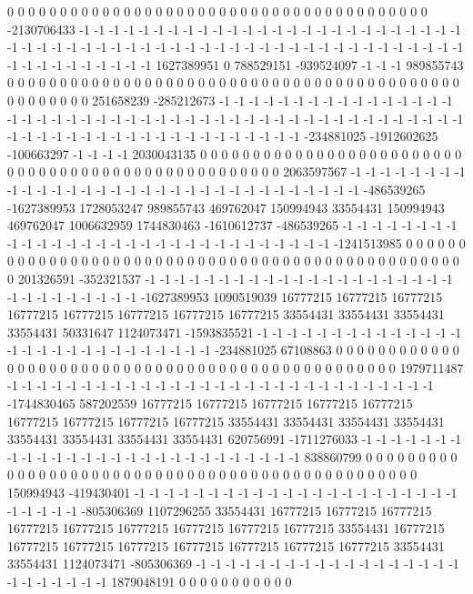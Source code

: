 0 0 0 0 0 0 0 0 0 0 0 0 0 0 0 0 0 0 0 0 0 0 0 0 0 0 0 0 0 0 0 0 0 0 0 0 0 0 0 0 -2130706433 -1 -1 -1 -1 -1 -1 -1 -1 -1 -1 -1 -1 -1 -1 -1 -1 -1 -1 -1 -1 -1 -1 -1 -1 -1 -1 -1 -1 -1 -1 -1 -1 -1 -1 -1 -1 -1 -1 -1 -1 -1 -1 -1 -1 -1 -1 -1 -1 -1 -1 -1 -1 -1 -1 -1 -1 -1 -1 -1 -1 -1 -1 -1 -1 -1 -1 -1 1627389951 0 788529151 -939524097 -1 -1 -1 989855743 0 0 0 0 0 0 0 0 0 0 0 0
0 0 0 0 0 0 0 0 0 0 0 0 0 0 0 0 0 0 0 0 0 0 0 0 0 0 0 0 0 0 0 0 0 0 0 0 0 0 0 251658239 -285212673 -1 -1 -1 -1 -1 -1 -1 -1 -1 -1 -1 -1 -1 -1 -1 -1 -1 -1 -1 -1 -1 -1 -1 -1 -1 -1 -1 -1 -1 -1 -1 -1 -1 -1 -1 -1 -1 -1 -1 -1 -1 -1 -1 -1 -1 -1 -1 -1 -1 -1 -1 -1 -1 -1 -1 -1 -1 -1 -1 -1 -1 -1 -1 -1 -1 -1 -1 -234881025 -1912602625 -100663297 -1 -1 -1 -1 2030043135 0 0 0 0 0 0 0 0 0 0 0 0
0 0 0 0 0 0 0 0 0 0 0 0 0 0 0 0 0 0 0 0 0 0 0 0 0 0 0 0 0 0 0 0 0 0 0 0 0 0 0 2063597567 -1 -1 -1 -1 -1 -1 -1 -1 -1 -1 -1 -1 -1 -1 -1 -1 -1 -1 -1 -1 -1 -1 -1 -1 -1 -1 -1 -1 -1 -1 -1 -1 -486539265 -1627389953 1728053247 989855743 469762047 150994943 33554431 150994943 469762047 1006632959 1744830463 -1610612737 -486539265 -1 -1 -1 -1 -1 -1 -1 -1 -1 -1 -1 -1 -1 -1 -1 -1 -1 -1 -1 -1 -1 -1 -1 -1 -1 -1 -1 -1 -1 -1 -1241513985 0 0 0 0 0 0 0 0 0 0 0 0
0 0 0 0 0 0 0 0 0 0 0 0 0 0 0 0 0 0 0 0 0 0 0 0 0 0 0 0 0 0 0 0 0 0 0 0 0 0 201326591 -352321537 -1 -1 -1 -1 -1 -1 -1 -1 -1 -1 -1 -1 -1 -1 -1 -1 -1 -1 -1 -1 -1 -1 -1 -1 -1 -1 -1 -1 -1 -1 -1627389953 1090519039 16777215 16777215 16777215 16777215 16777215 16777215 16777215 16777215 33554431 33554431 33554431 33554431 50331647 1124073471 -1593835521 -1 -1 -1 -1 -1 -1 -1 -1 -1 -1 -1 -1 -1 -1 -1 -1 -1 -1 -1 -1 -1 -1 -1 -1 -1 -1 -1 -1 -234881025 67108863 0 0 0 0 0 0 0 0 0 0 0
0 0 0 0 0 0 0 0 0 0 0 0 0 0 0 0 0 0 0 0 0 0 0 0 0 0 0 0 0 0 0 0 0 0 0 0 0 0 1979711487 -1 -1 -1 -1 -1 -1 -1 -1 -1 -1 -1 -1 -1 -1 -1 -1 -1 -1 -1 -1 -1 -1 -1 -1 -1 -1 -1 -1 -1 -1744830465 587202559 16777215 16777215 16777215 16777215 16777215 16777215 16777215 16777215 16777215 33554431 33554431 33554431 33554431 33554431 33554431 33554431 33554431 620756991 -1711276033 -1 -1 -1 -1 -1 -1 -1 -1 -1 -1 -1 -1 -1 -1 -1 -1 -1 -1 -1 -1 -1 -1 -1 -1 -1 -1 -1 838860799 0 0 0 0 0 0 0 0 0 0 0
0 0 0 0 0 0 0 0 0 0 0 0 0 0 0 0 0 0 0 0 0 0 0 0 0 0 0 0 0 0 0 0 0 0 0 0 0 150994943 -419430401 -1 -1 -1 -1 -1 -1 -1 -1 -1 -1 -1 -1 -1 -1 -1 -1 -1 -1 -1 -1 -1 -1 -1 -1 -1 -1 -1 -805306369 1107296255 33554431 16777215 16777215 16777215 16777215 16777215 16777215 16777215 16777215 16777215 33554431 16777215 16777215 16777215 16777215 16777215 16777215 16777215 16777215 33554431 33554431 1124073471 -805306369 -1 -1 -1 -1 -1 -1 -1 -1 -1 -1 -1 -1 -1 -1 -1 -1 -1 -1 -1 -1 -1 -1 -1 -1 -1 1879048191 0 0 0 0 0 0 0 0 0 0 0

